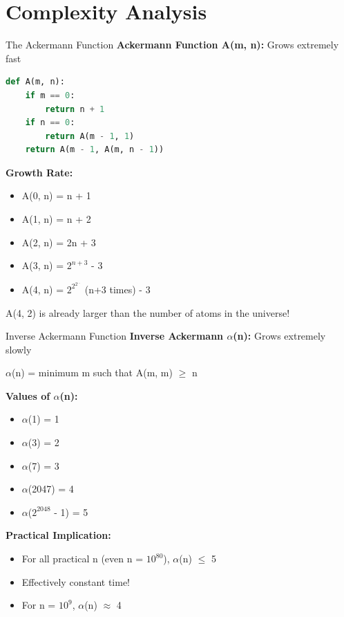 \documentclass[aspectratio=169]{beamer}
\begin{document}
\section{Complexity Analysis}

\begin{frame}[fragile]{The Ackermann Function}
  \textbf{Ackermann Function A(m, n):} Grows extremely fast

  \vspace{0.3cm}
  \begin{lstlisting}[language=Python, basicstyle=\ttfamily\footnotesize]
def A(m, n):
    if m == 0:
        return n + 1
    if n == 0:
        return A(m - 1, 1)
    return A(m - 1, A(m, n - 1))
  \end{lstlisting}

  \vspace{0.3cm}
  \textbf{Growth Rate:}
  \begin{itemize}
    \item A(0, n) = n + 1
    \item A(1, n) = n + 2
    \item A(2, n) = 2n + 3
    \item A(3, n) = $2^{n+3}$ - 3
    \item A(4, n) = $2^{2^{2^{...}}}$ (n+3 times) - 3
  \end{itemize}

  \vspace{0.3cm}
  A(4, 2) is already larger than the number of atoms in the universe!
\end{frame}

\begin{frame}{Inverse Ackermann Function}
  \textbf{Inverse Ackermann $\alpha$(n):} Grows extremely slowly

  \vspace{0.3cm}
  $\alpha$(n) = minimum m such that A(m, m) $\geq$ n

  \vspace{0.5cm}
  \textbf{Values of $\alpha$(n):}
  \begin{itemize}
    \item $\alpha$(1) = 1
    \item $\alpha$(3) = 2
    \item $\alpha$(7) = 3
    \item $\alpha$(2047) = 4
    \item $\alpha$($2^{2048}$ - 1) = 5
  \end{itemize}

  \vspace{0.5cm}
  \textbf{Practical Implication:}
  \begin{itemize}
    \item For all practical n (even n = $10^{80}$), $\alpha$(n) $\leq$ 5
    \item Effectively constant time!
    \item For n = $10^9$, $\alpha$(n) $\approx$ 4
  \end{itemize}
\end{frame}
\end{document}
